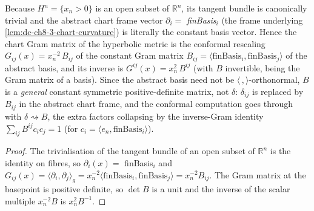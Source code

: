 \begin{lemma}
  \label{lem:dc-ch8-3-hyperbolic-chart-gram}


  Because $H^n=\{x_n>0\}$ is an open subset of $\mathbb R^n$, its tangent bundle is
  canonically trivial and the abstract chart frame vector
  $\partial_i=$ \emph{finBasis}$_i$ (the frame underlying \cref{lem:dc-ch8-3-chart-curvature})
  is literally the constant basis vector. Hence the chart Gram matrix of the
  hyperbolic metric is the conformal rescaling
  $G_{ij}(x)=x_n^{-2}\,B_{ij}$ of the constant Gram matrix
  $B_{ij}=\langle\text{finBasis}_i,\text{finBasis}_j\rangle$ of the abstract basis,
  and its inverse is $G^{ij}(x)=x_n^{2}\,B^{ij}$ (with $B$ invertible, being the
  Gram matrix of a basis). Since the abstract basis need not be
  $\langle\,,\rangle$-orthonormal, $B$ is a \emph{general} constant symmetric
  positive-definite matrix, not $\delta$: $\delta_{ij}$ is
  replaced by $B_{ij}$ in the abstract chart frame, and the conformal
  computation goes through with $\delta\rightsquigarrow B$, the extra factors
  collapsing by the inverse-Gram identity $\sum_{ij}B^{ij}c_ic_j=1$ (for
  $c_i=\langle e_n,\text{finBasis}_i\rangle$).
\end{lemma}
\begin{proof}

\sketch
  The trivialisation of the tangent bundle of an open subset of $\mathbb R^n$ is
  the identity on fibres, so $\partial_i(x)=$ finBasis$_i$ and
  $G_{ij}(x)=\langle\partial_i,\partial_j\rangle_g=x_n^{-2}\langle\text{finBasis}_i,\text{finBasis}_j\rangle=x_n^{-2}B_{ij}$.
  The Gram matrix at the basepoint is positive definite, so $\det B$ is a unit and
  the inverse of the scalar multiple $x_n^{-2}B$ is $x_n^{2}B^{-1}$.
\end{proof}

